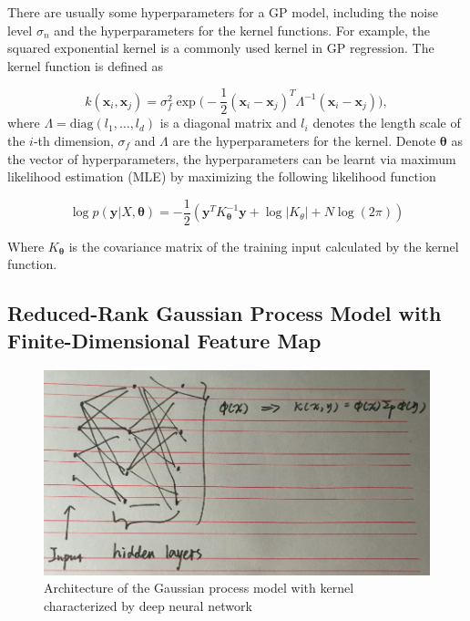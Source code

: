 There are usually some hyperparameters for a GP model, including the noise level $\sigma_n$ and the hyperparameters for the kernel functions. For example, the squared exponential kernel is a commonly used kernel in GP regression. The kernel function is defined as

\begin{equation}
    \label{eq:GaussianCovarianceFunction}
    k(\bm{x}_i, \bm{x}_j) = \sigma_f^2 \exp\Big(-\frac{1}{2}(\bm{x}_i - \bm{x}_j)^T\Lambda^{-1}(\bm{x}_i - \bm{x}_j)\Big),
\end{equation}
where $\Lambda = \mathrm{diag}(l_1, \dots, l_d)$ is a diagonal matrix and $l_i$ denotes the length scale of the $i$-th dimension, $\sigma_f$ and $\Lambda$ are the hyperparameters for the kernel. Denote $\bm{\theta}$ as the vector of hyperparameters, the hyperparameters can be learnt via maximum likelihood estimation (MLE) by maximizing the following likelihood function

\begin{equation}
    \label{eq:GPloglikelihood}
    \log p(\bm{y} | X, \bm{\theta}) = -\frac{1}{2}(\bm{y}^T K_{\bm{\theta}}^{-1} \bm{y} + \log |K_{\theta}| + N \log(2 \pi))
\end{equation}

Where $K_{\bm{\theta}}$ is the covariance matrix of the training input calculated by the kernel function.

\subsection{Reduced-Rank Gaussian Process Model with Finite-Dimensional Feature Map}\label{sec:NNGP}

\begin{figure}[!htb]
    \centering
    \includegraphics[width=\columnwidth]{./img/NN-GP.png}
    \caption{Architecture of the Gaussian process model with kernel characterized by deep neural network}
    \label{fig:NNGP}
\end{figure}

